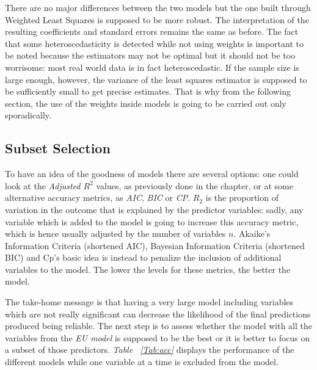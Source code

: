 \documentclass[a4paper,12pt]{book}
\begin{document}
There are no major differences between the two models but the one built through Weighted Least Squares is supposed to be more robust. The interpretation of the resulting coefficients and standard errors remains the same as before. The fact that some heteroscedasticity is detected while not using weights is important to be noted because the estimators may not be optimal but it should not be too worrisome: most real world data is in fact heteroscedastic. If the sample size is large enough, however, the variance of the least squares estimator is supposed to be sufficiently small to get precise estimates. That is why from the following section, the use of the weights inside models is going to be carried out only sporadically.

\subsection{Subset Selection}

To have an idea of the goodness of models there are several options: one could look at the \textit{Adjusted $R^{2}$} values, as previously done in the chapter, or at some alternative accuracy metrics, as \textit{AIC}, \textit{BIC} or \textit{CP}. $R_2$ is the proportion of variation in the outcome that is explained by the predictor variables: sadly, any variable which is added to the model is going to increase this accuracy metric, which is hence usually adjusted by the number of variables $n$. Akaike's Information Criteria (shortened AIC), Bayesian Information Criteria (shortened BIC) and Cp's basic idea is instead to penalize the inclusion of additional variables to the model. The lower the levels for these metrics, the better the model.

The take-home message is that having a very large model including variables which are not really significant can decrease the likelihood of the final predictions produced being reliable. The next step is to assess whether the model with all the variables from the \textit{EU model} is supposed to be the best or it is better to focus on a subset of those predictors. \textit{Table ~\ref{Tab:acc}} displays the performance of the different models while one variable at a time is excluded from the model.
\end{document}
